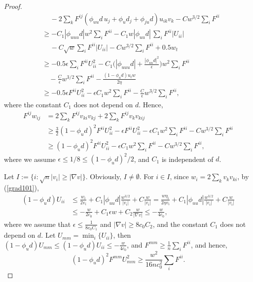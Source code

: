 \documentclass[12pt]{amsart}
\theoremstyle{definition}
\theoremstyle{remark}
\numberwithin{equation}{section}
\begin{document}
\begin{proof}
\begin{equation}
\begin{aligned}
	& \,\,\,\,\,\,\, - 2 \sum_k F^{ij} (\phi_{uu}d\, u_j + \phi_u d_j + \phi_{ju}d) u_{ik} v_k - Cw^{3/2}\sum_i F^{ii} \\
	& \geq  - C_1 |\phi_{uuu} d| w^2 \sum_i F^{ii} - C_1 w |\phi_{uu} d|\, \sum_i F^{ii}|U_{ii}|\\
	& \,\,\,\,\,\,\, - C\sqrt{w}\sum_i F^{ii}|U_{ii}| - Cw^{3/2}\sum_i F^{ii} + 0.5 w_t \\
	& \geq   - 0.5\epsilon \sum_i F^{ii}U_{ii}^2 - C_1 \Bigg( |\phi_{uuu} d| + \frac{|\phi_{uu} d|^2}{\epsilon} \Bigg) w^2 \sum_i F^{ii} \\
	& \quad - \frac{C}{\epsilon} w^{3/2}\sum_i F^{ii} -\frac{ (1 - \phi_u d) u_t w}{2\eta} \\
	& \geq - 0.5\epsilon F^{ii}U_{ii}^2 - \epsilon C_1 w^2 \sum_i F^{ii}  - \frac{C}{\epsilon} w^{3/2}\sum_i F^{ii},
	\end{aligned}
	\end{equation}
	where the constant $C_1$ does not depend on $d$.
	Hence,
	\begin{equation}\label{F_ij*w_ij_left_ext}
	\begin{aligned}
	F^{ij} w_{ij} & = 2 \sum_k F^{ij} v_{ki} v_{kj} + 2 \sum_k F^{ij} v_k v_{kij}\\
	& \geq \frac{3}{2} (1-\phi_u d)^2 F^{ii}  U_{ii}^2 - \epsilon F^{ii}U_{ii}^2 - \epsilon C_1 w^2 \sum_i F^{ii}  - Cw^{3/2}\sum_i F^{ii}\\
	& \geq (1-\phi_u d)^2 F^{ii}  U_{ii}^2 - \epsilon C_1 w^2 \sum_i F^{ii}  - Cw^{3/2}\sum_i F^{ii},
	\end{aligned}
	\end{equation}
	where we assume $\epsilon \leq 1/8 \leq (1-\phi_u d)^2/2$, and $C_1$ is independent of $d$.
	
	
	Let $I:= \{ i : \sqrt{n}|v_i| \geq |\nabla v| \}$. Obviously, $I\neq \emptyset$. For $i\in I$, since $w_i = 2 \sum_k v_k v_{ki}$, by (\ref{grad101}),
	\begin{equation}
	\begin{aligned}
	(1 - \phi_u d)U_{ii} & \leq \frac{w_i}{2v_i} + C_1 |\phi_{uu} d| \frac{w^{3/2}}{|v_i|} + C \frac{w}{|v_i|} = \frac{w \eta_i}{2\eta v_i} + C_1 |\phi_{uu} d| \frac{w^{3/2}}{|v_i|} + C \frac{w}{|v_i|} \\
	& \leq -\frac{ w}{2 c_0} + C_1 \epsilon w + C_2 \frac{w}{|\nabla v|} \leq -\frac{ w}{4 c_0},
	\end{aligned}
	\end{equation}
	where we assume that $\epsilon \leq \frac{1}{8 c_0 C_1}$ and $|\nabla v| \geq 8 c_0 C_2$, and the constant $C_1$ does not depend on $d$. Let $U_{mm} = \min_i \{U_{ii} \}$, then $(1 - \phi_u d) U_{mm} \leq (1 - \phi_u d) U_{ii} \leq -\frac{ w}{4 c_0}$, and $F^{mm} \geq \frac{1}{n} \sum_i F^{ii}$, and hence,
	\begin{equation}\label{f_lambda^2_m}
	(1 - \phi_u d)^2 F^{mm}U_{mm}^2 \geq \frac{w^2}{16nc_0^2}\sum_i F^{ii}.
	\end{equation}
	

\end{proof}
\end{document}
